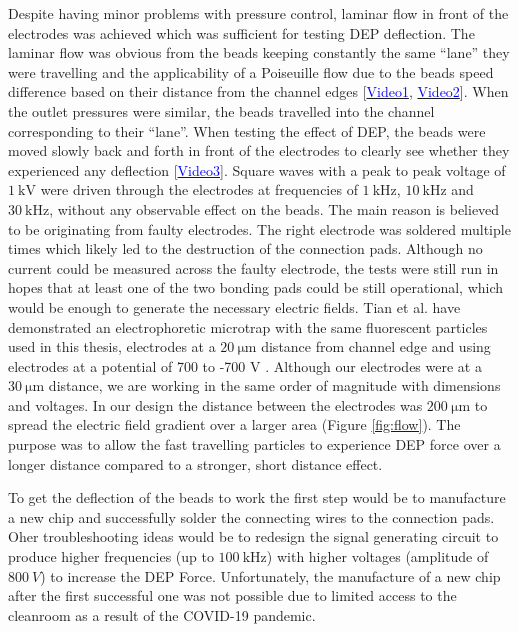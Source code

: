 \documentclass[final]{jyflluk}
\begin{document}
Despite having minor problems with pressure control, laminar flow in front of the electrodes was achieved which was sufficient for testing DEP deflection. The laminar flow was obvious from the beads keeping constantly the same “lane” they were travelling and the applicability of a Poiseuille flow due to the beads speed difference based on their distance from the channel edges [\href{https://youtu.be/iNh1GMUPQsE}{\textcolor{blue}{Video1}}, \href{https://youtu.be/Xz-v59IJdyM}{\textcolor{blue}{Video2}}]. When the outlet pressures were similar, the beads travelled into the channel corresponding to their “lane”. When testing the effect of DEP, the beads were moved slowly back and forth in front of the electrodes to clearly see whether they experienced any deflection [\href{https://youtu.be/15CEVs_O_H0}{\textcolor{blue}{Video3}}]. Square waves with a peak to peak voltage of $\SI{1}{\kilo \volt}$ were driven through the electrodes at frequencies of $\SI{1}{\kilo \Hz}$, $\SI{10}{\kilo \Hz}$ and $\SI{30}{\kilo \Hz}$, without any observable effect on the beads. The main reason is believed to be originating from faulty electrodes. The right electrode was soldered multiple times which likely led to the destruction of the connection pads. Although no current could be measured across the faulty electrode, the tests were still run in hopes that at least one of the two bonding pads could be still operational, which would be enough to generate the necessary electric fields. Tian et al. have demonstrated an electrophoretic microtrap with the same fluorescent particles used in this thesis, electrodes at a $\SI{20}{\micro \metre}$ distance from channel edge and using electrodes at a potential of  700 to -700 V \cite{tian2018handy}. Although our electrodes were at a $\SI{30}{\micro \metre}$ distance, we are working in the same order of magnitude with dimensions and voltages. In our design the distance between the electrodes was $\SI{200}{\micro \metre}$ to spread the electric field gradient over a larger area (Figure \ref{fig:flow}). The purpose was to allow the fast travelling particles to experience DEP force over a longer distance compared to a stronger, short distance effect.

To get the deflection of the beads to work the first step would be to manufacture a new chip and successfully solder the connecting wires to the connection pads. Oher troubleshooting ideas would be to redesign the signal generating circuit to produce higher frequencies (up to $\SI{100}{\kilo \Hz}$) with higher voltages (amplitude of $\SI{800}{V}$) to increase the DEP Force. Unfortunately, the manufacture of a new chip after the first successful one was not possible due to limited access to the cleanroom as a result of the COVID-19 pandemic.
\end{document}
